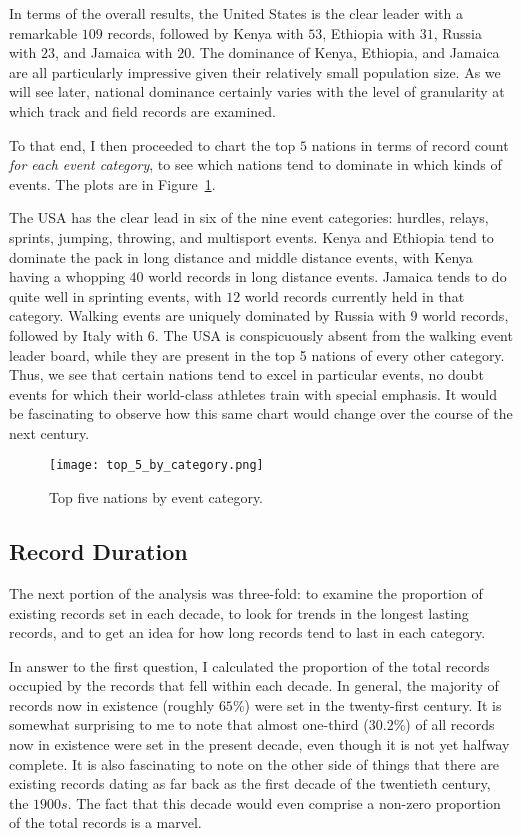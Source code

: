 \documentclass{article}
\begin{document}
In terms of the overall results, the United States is the clear leader with a remarkable $109$ records, followed 
by Kenya with $53$, Ethiopia with $31$, Russia with $23$, and Jamaica with $20$.  The dominance of Kenya, Ethiopia, 
and Jamaica are all particularly impressive given their relatively small population size.  As we will see later, 
national dominance certainly varies with the level of granularity at which track and field records are examined.  

To that end, I then proceeded to chart the top $5$ nations in terms of record count \textit{for each event category}, 
to see which nations tend to dominate in which kinds of events.  The plots are in Figure~\ref{fig:top_5}.  

The USA has the clear lead in six of the nine event categories: hurdles, relays, sprints, jumping, throwing, and 
multisport events.  Kenya and Ethiopia tend to dominate the pack in long distance and middle distance events, with 
Kenya having a whopping $40$ world records in long distance events.  Jamaica tends to do quite well in sprinting 
events, with $12$ world records currently held in that category.  Walking events are uniquely dominated by Russia 
with $9$ world records, followed by Italy with $6$.  The USA is conspicuously absent from the walking event leader 
board, while they are present in the top 5 nations of every other category.  Thus, we see that certain nations tend 
to excel in particular events, no doubt events for which their world-class athletes train with special emphasis.  
It would be fascinating to observe how this same chart would change over the course of the next century.  

\begin{figure}
    \centering
    \texttt{[image: top\_5\_by\_category.png]}
    \caption{Top five nations by event category.}
    \label{fig:top_5}
\end{figure}

\subsection{Record Duration}

The next portion of the analysis was three-fold: to examine the proportion of existing records set in each decade, 
to look for trends in the longest lasting records, and to get an idea for how long records tend to last in each 
category.  

In answer to the first question, I calculated the proportion of the total records occupied by the records that fell 
within each decade.  In general, the majority of records now in existence (roughly $65\%$) were set in the twenty-first 
century.  It is somewhat surprising to me to note that almost one-third ($30.2\%$) of all records now in existence 
were set in the present decade, even though it is not yet halfway complete.  It is also fascinating to note on the 
other side of things that there are existing records dating as far back as the first decade of the twentieth century, 
the $1900s$.  The fact that this decade would even comprise a non-zero proportion of the total records is a marvel.  
\end{document}

